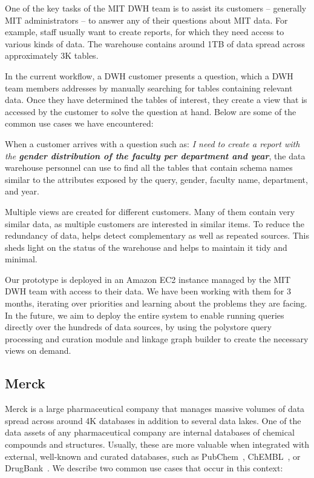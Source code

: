 One of the key tasks of the MIT DWH team is to assist its customers --
generally MIT administrators -- to answer any of their questions about MIT
data. For example, staff usually want to create reports, for which they need
access to various kinds of data. The warehouse contains around 1TB of data
spread across approximately 3K tables.

In the current workflow, a
DWH customer presents a question, which a DWH team
members addresses by manually searching for tables containing relevant data. Once they have determined
the tables of interest, they create a view that is accessed by the customer to
solve the question at hand. Below are some of the common use cases we have
encountered:

 When a customer arrives with a question such as:
\emph{I need to create a report with the \textbf{gender distribution of the
faculty per department and year}}, the data warehouse personnel can use \dcv to
find all the tables that contain schema names similar to the attributes exposed
by the query, \eg gender, faculty name, department, and year.

 Multiple views are created for different customers.
Many of them contain very similar data, as multiple customers are
interested in similar items. To reduce the redundancy of data, \dcv helps
detect complementary as well as repeated sources. This sheds light on the status
of the warehouse and helps to maintain it tidy and minimal.

Our prototype is deployed in an Amazon EC2 instance managed by the MIT DWH team
with access to their data. We have been working with them for 3 months,
iterating over priorities and learning about the problems they are facing.
In the future, we aim to deploy the entire \dcv system to enable running queries
directly over the hundreds of data sources, by using the polystore query
processing and curation module and linkage graph builder to create the necessary
views on demand. 

\vspace{-.25em}
\subsection{Merck}

Merck is a large pharmaceutical company that manages massive volumes of data spread
across around 4K databases in addition to several data lakes. 
One of the data assets of any pharmaceutical company are internal databases of
chemical compounds and structures. Usually, these are more valuable when
integrated with external, well-known and curated databases, such as
PubChem~\cite{pubchem}, ChEMBL~\cite{ChEMBL}, or DrugBank~\cite{DrugBank}. We
describe two common use cases that occur in this context:

